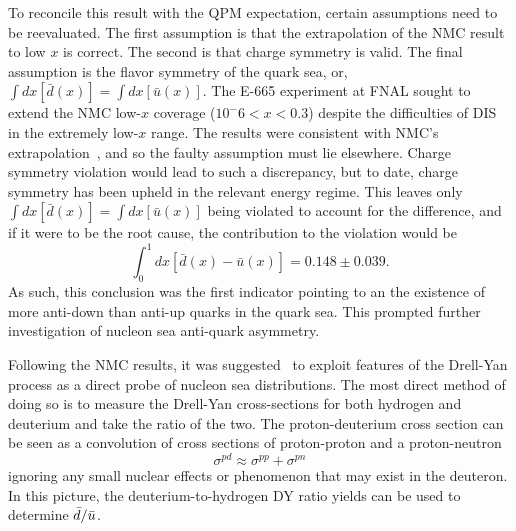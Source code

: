 To reconcile this result with the QPM expectation, certain assumptions need to be reevaluated. The first assumption is that the extrapolation of the NMC result to low $x$ is correct. The second is that charge symmetry is valid. The final assumption is the flavor symmetry of the quark sea, or, $\int dx [\bar{d}(x)] = \int dx [\bar{u}(x)]$. The E-665 experiment at FNAL sought to extend the NMC low-$x$ coverage ($10^-6 < x < 0.3$) despite the difficulties of DIS in the extremely low-$x$ range. The results were consistent with NMC's extrapolation~\cite{Adams:1995sh}, and so the faulty assumption must lie elsewhere. Charge symmetry violation would lead to such a discrepancy, but to date, charge symmetry has been upheld in the relevant energy regime\cite{Abegg:1998sg}. This leaves only $\int dx [\bar{d}(x)] = \int dx [\bar{u}(x)]$ being violated to account for the difference, and if it were to be the root cause, the contribution to the violation would be
\begin{equation}
\int_0^1 dx[\bar{d}(x) - \bar{u}(x)] = 0.148 \pm 0.039.
\end{equation}
As such, this conclusion was the first indicator pointing to an the existence of more anti-down than anti-up quarks in the quark sea. This prompted further investigation of nucleon sea anti-quark asymmetry.

Following the NMC results, it was suggested~\cite{Ellis:1990ti} to exploit features of the Drell-Yan process as a direct probe of nucleon sea distributions. The most direct method of doing so is to measure the Drell-Yan cross-sections for both hydrogen and deuterium and take the ratio of the two. The proton-deuterium cross section can be seen as a convolution of cross sections of proton-proton and a proton-neutron
\begin{equation}
\sigma^{pd} \approx \sigma^{pp} + \sigma^{pn}
\end{equation}
ignoring any small nuclear effects or phenomenon that may exist in the deuteron. In this picture, the deuterium-to-hydrogen DY ratio yields can be used to determine $\bar{d}/\bar{u}$.

